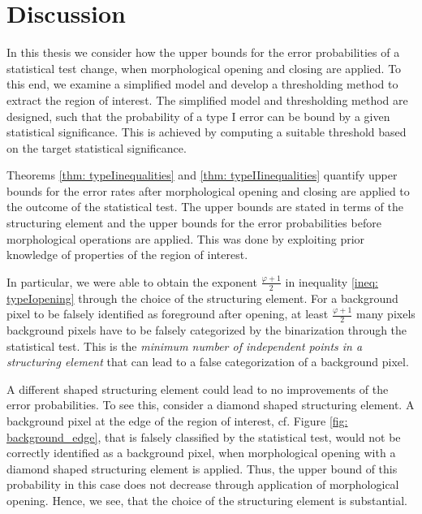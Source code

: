 \documentclass[a4paper,12pt]{article}
\theoremstyle{plain}
\theoremstyle{definition}
\begin{document}






\newpage



\section{Discussion}\label{section: conclusion}

In this thesis we consider how the upper bounds for the error probabilities of a statistical test change, when morphological opening and closing are applied. To this end, we examine a simplified model and develop a thresholding method to extract the region of interest. The simplified model and thresholding method are designed, such that the probability of a type I error can be bound by a given statistical significance. This is achieved by computing a suitable threshold based on the target statistical significance.

Theorems \ref{thm: typeIinequalities} and \ref{thm: typeIIinequalities} quantify upper bounds for the error rates after morphological opening and closing are applied to the outcome of the statistical test. The upper bounds are stated in terms of the structuring element and the upper bounds for the error probabilities before morphological operations are applied. This was done by exploiting prior knowledge of properties of the region of interest.

In particular, we were able to obtain the exponent $\frac{\varphi + 1}{2}$ in inequality \eqref{ineq: typeIopening} through the choice of the structuring element. For a background pixel to be falsely identified as foreground after opening, at least $\frac{\varphi + 1}{2}$ many pixels background pixels have to be falsely categorized by the binarization through the statistical test. This is the \emph{minimum number of independent points in a structuring element} that can lead to a false categorization of a background pixel.

A different shaped structuring element could lead to no improvements of the error probabilities. To see this, consider a diamond shaped structuring element. A background pixel at the edge of the region of interest, cf. Figure \ref{fig: background_edge}, that is falsely classified by the statistical test, would not be correctly identified as a background pixel, when morphological opening with a diamond shaped structuring element is applied. Thus, the upper bound of this probability in this case does not decrease through application of morphological opening. Hence, we see, that the choice of the structuring element is substantial.
\end{document}
